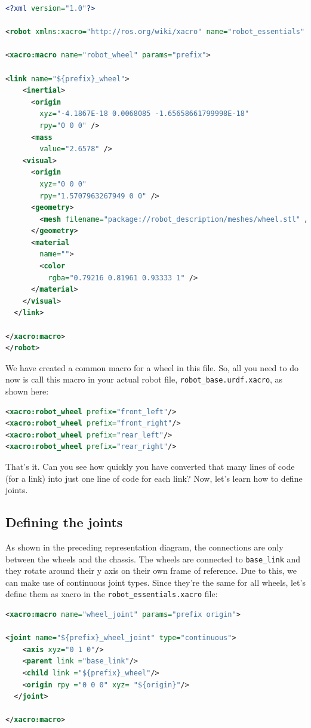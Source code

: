\documentclass[letterpaper,pdftex]{article}
\begin{document}
\begin{lstlisting}[language=xml]
<?xml version="1.0"?>

<robot xmlns:xacro="http://ros.org/wiki/xacro" name="robot_essentials" >

<xacro:macro name="robot_wheel" params="prefix">

<link name="${prefix}_wheel">
    <inertial>
      <origin
        xyz="-4.1867E-18 0.0068085 -1.65658661799998E-18"
        rpy="0 0 0" />
      <mass
        value="2.6578" />
    <visual>
      <origin
        xyz="0 0 0"
        rpy="1.5707963267949 0 0" />
      <geometry>
        <mesh filename="package://robot_description/meshes/wheel.stl" />
      </geometry>
      <material
        name="">
        <color
          rgba="0.79216 0.81961 0.93333 1" />
      </material>
    </visual>
  </link>

</xacro:macro>
</robot>
\end{lstlisting}

We have created a common macro for a wheel in this file. So, all you need to do now is call this macro in your actual robot file, \verb|robot_base.urdf.xacro|, as shown here:

\begin{lstlisting}[language=xml]
<xacro:robot_wheel prefix="front_left"/>
<xacro:robot_wheel prefix="front_right"/>
<xacro:robot_wheel prefix="rear_left"/>
<xacro:robot_wheel prefix="rear_right"/>
\end{lstlisting}

That's it. Can you see how quickly you have converted that many lines of code (for a link) into just one line of code for each link? Now, let's learn how to define joints.

\subsection{Defining the joints}

As shown in the preceding representation diagram, the connections are only between the wheels and the chassis. The wheels are connected to \verb|base_link| and they rotate around their y axis on their own frame of reference. Due to this, we can make use of continuous joint types. Since they're the same for all wheels, let's define them as xacro in the \verb|robot_essentials.xacro| file:

\begin{lstlisting}[language=xml]
<xacro:macro name="wheel_joint" params="prefix origin">

<joint name="${prefix}_wheel_joint" type="continuous">
    <axis xyz="0 1 0"/>
    <parent link ="base_link"/>
    <child link ="${prefix}_wheel"/>
    <origin rpy ="0 0 0" xyz= "${origin}"/>
  </joint>

</xacro:macro>
\end{lstlisting}
\end{document}
